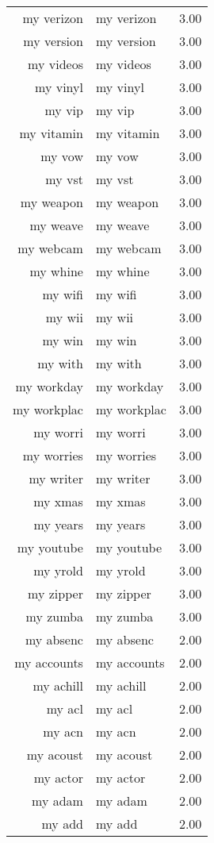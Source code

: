 \begin{table}[ht]
\begin{tabular}{rlr}
  my verizon & my verizon & 3.00 \\ 
  my version & my version & 3.00 \\ 
  my videos & my videos & 3.00 \\ 
  my vinyl & my vinyl & 3.00 \\ 
  my vip & my vip & 3.00 \\ 
  my vitamin & my vitamin & 3.00 \\ 
  my vow & my vow & 3.00 \\ 
  my vst & my vst & 3.00 \\ 
  my weapon & my weapon & 3.00 \\ 
  my weave & my weave & 3.00 \\ 
  my webcam & my webcam & 3.00 \\ 
  my whine & my whine & 3.00 \\ 
  my wifi & my wifi & 3.00 \\ 
  my wii & my wii & 3.00 \\ 
  my win & my win & 3.00 \\ 
  my with & my with & 3.00 \\ 
  my workday & my workday & 3.00 \\ 
  my workplac & my workplac & 3.00 \\ 
  my worri & my worri & 3.00 \\ 
  my worries & my worries & 3.00 \\ 
  my writer & my writer & 3.00 \\ 
  my xmas & my xmas & 3.00 \\ 
  my years & my years & 3.00 \\ 
  my youtube & my youtube & 3.00 \\ 
  my yrold & my yrold & 3.00 \\ 
  my zipper & my zipper & 3.00 \\ 
  my zumba & my zumba & 3.00 \\ 
  my absenc & my absenc & 2.00 \\ 
  my accounts & my accounts & 2.00 \\ 
  my achill & my achill & 2.00 \\ 
  my acl & my acl & 2.00 \\ 
  my acn & my acn & 2.00 \\ 
  my acoust & my acoust & 2.00 \\ 
  my actor & my actor & 2.00 \\ 
  my adam & my adam & 2.00 \\ 
  my add & my add & 2.00 \\ 

\end{tabular}
\end{table}
